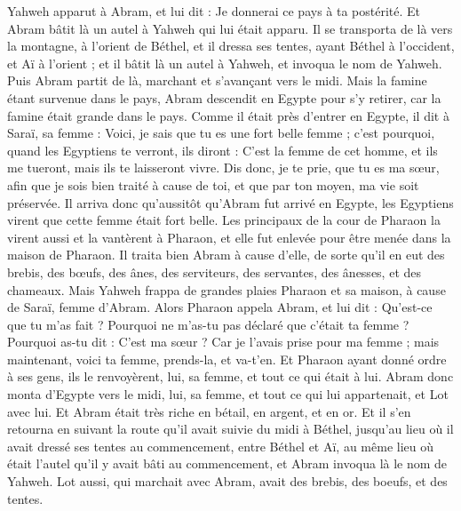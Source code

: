 \begin{multicols}{2}
Yahweh apparut à Abram, et lui dit : Je donnerai ce pays à ta postérité. Et Abram bâtit là un autel à Yahweh qui lui était apparu.
Il se transporta de là vers la montagne, à l'orient de Béthel, et il dressa ses tentes, ayant Béthel à l'occident, et Aï à l'orient ; et il bâtit là un autel à Yahweh, et invoqua le nom de Yahweh.
Puis Abram partit de là, marchant et s'avançant vers le midi.
Mais la famine étant survenue dans le pays, Abram descendit en Egypte pour s'y retirer, car la famine était grande dans le pays.
Comme il était près d'entrer en Egypte, il dit à Saraï, sa femme : Voici, je sais que tu es une fort belle femme ;
c'est pourquoi, quand les Egyptiens te verront, ils diront : C'est la femme de cet homme, et ils me tueront, mais ils te laisseront vivre.
Dis donc, je te prie, que tu es ma sœur, afin que je sois bien traité à cause de toi, et que par ton moyen, ma vie soit préservée.
Il arriva donc qu'aussitôt qu'Abram fut arrivé en Egypte, les Egyptiens virent que cette femme était fort belle.
Les principaux de la cour de Pharaon la virent aussi et la vantèrent à Pharaon, et elle fut enlevée pour être menée dans la maison de Pharaon.
Il traita bien Abram à cause d'elle, de sorte qu'il en eut des brebis, des bœufs, des ânes, des serviteurs, des servantes, des ânesses, et des chameaux.
Mais Yahweh frappa de grandes plaies Pharaon et sa maison, à cause de Saraï, femme d'Abram.
Alors Pharaon appela Abram, et lui dit : Qu'est-ce que tu m'as fait ? Pourquoi ne m'as-tu pas déclaré que c'était ta femme ?
Pourquoi as-tu dit : C'est ma sœur ? Car je l'avais prise pour ma femme ; mais maintenant, voici ta femme, prends-la, et va-t'en.
Et Pharaon ayant donné ordre à ses gens, ils le renvoyèrent, lui, sa femme, et tout ce qui était à lui.
\VerseOne{}Abram donc monta d'Egypte vers le midi, lui, sa femme, et tout ce qui lui appartenait, et Lot avec lui.
Et Abram était très riche en bétail, en argent, et en or.
Et il s'en retourna en suivant la route qu'il avait suivie du midi à Béthel, jusqu'au lieu où il avait dressé ses tentes au commencement, entre Béthel et Aï,
au même lieu où était l'autel qu'il y avait bâti au commencement, et Abram invoqua là le nom de Yahweh.
Lot aussi, qui marchait avec Abram, avait des brebis, des boeufs, et des tentes.

\end{multicols}
